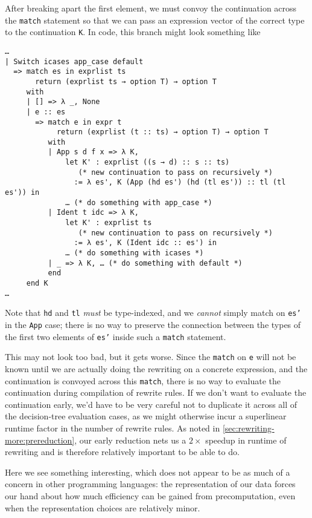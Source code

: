 After breaking apart the first element, we must convoy the continuation across the \texttt{match} statement so that we can pass an expression vector of the correct type to the continuation \texttt{K}.
In code, this branch might look something like
\begin{verbatim}
…
| Switch icases app_case default
  => match es in exprlist ts
       return (exprlist ts → option T) → option T
     with
     | [] => λ _, None
     | e :: es
       => match e in expr t
            return (exprlist (t :: ts) → option T) → option T
          with
          | App s d f x => λ K,
              let K' : exprlist ((s → d) :: s :: ts)
                 (* new continuation to pass on recursively *)
                := λ es', K (App (hd es') (hd (tl es')) :: tl (tl es')) in
              … (* do something with app_case *)
          | Ident t idc => λ K,
              let K' : exprlist ts
                 (* new continuation to pass on recursively *)
                := λ es', K (Ident idc :: es') in
              … (* do something with icases *)
          | _ => λ K, … (* do something with default *)
          end
     end K
…
\end{verbatim}
Note that \texttt{hd} and \texttt{tl} \emph{must} be type-indexed, and we \emph{cannot} simply match on \texttt{es'} in the \texttt{App} case;
there is no way to preserve the connection between the types of the first two elements of \texttt{es'} inside such a \texttt{match} statement.

This may not look too bad, but it gets worse.
Since the \texttt{match} on \texttt{e} will not be known until we are actually doing the rewriting on a concrete expression, and the continuation is convoyed across this \texttt{match}, there is no way to evaluate the continuation during compilation of rewrite rules.
If we don't want to evaluate the continuation early, we'd have to be very careful not to duplicate it across all of the decision-tree evaluation cases, as we might otherwise incur a superlinear runtime factor in the number of rewrite rules.
As noted in \autoref{sec:rewriting-more:prereduction}, our early reduction nets us a $2\times$ speedup in runtime of rewriting and is therefore relatively important to be able to do.

Here we see something interesting, which does not appear to be as much of a concern in other programming languages:
the representation of our data forces our hand about how much efficiency can be gained from precomputation, even when the representation choices are relatively minor.

